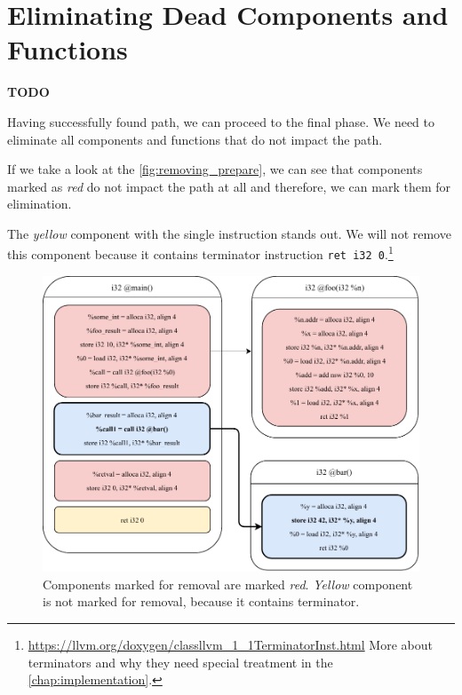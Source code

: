 \documentclass[12pt, twoside]{fithesis2}
\renewcommand{\_}{\leavevmode \kern0.07em\vbox{\hrule width0.4em}}
\begin{document}
\section{Eliminating Dead Components and Functions}
\label{sec:design-removing}

\textbf{TODO}

Having successfully found path, we can proceed to the final phase.
We need to eliminate all components and functions that do not impact the path.

If we take a look at the \autoref{fig:removing_prepare}, we can see that
components marked as \emph{red} do not impact the path at all and therefore, we
can mark them for elimination.

The \emph{yellow} component with the single instruction stands out.
We will not remove this component because it contains
terminator instruction \texttt{ret i32 0}.\footnote{
\url{https://llvm.org/doxygen/classllvm_1_1TerminatorInst.html}
More about terminators and why they need special treatment in the
\autoref{chap:implementation}.
}

\begin{figure}[ht]
    \centering
    \includegraphics[]{images/main_removing_prepare.pdf}
    \caption{
    Components marked for removal are marked \emph{red}. \emph{Yellow} component
    is not marked for removal, because it contains terminator.
    }
    \label{fig:removing_prepare}
\end{figure}
\end{document}
